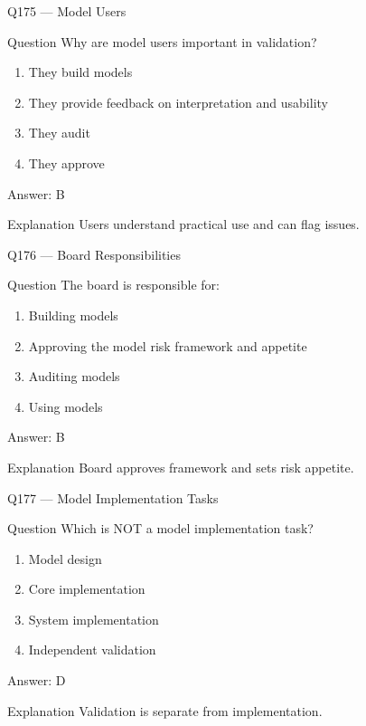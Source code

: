 \documentclass[aspectratio=169,8pt]{beamer}
\begin{document}
	\begin{frame}{Q175 --- Model Users}
		\begin{block}{Question}
			Why are model users important in validation?
		\end{block}
		\begin{enumerate}
			\item They build models
			\item They provide feedback on interpretation and usability
			\item They audit
			\item They approve
		\end{enumerate}
		\begin{exampleblock}{Answer: B}\end{exampleblock}
		\begin{block}{Explanation}
			Users understand practical use and can flag issues.
		\end{block}
	\end{frame}
	
	\begin{frame}{Q176 --- Board Responsibilities}
		\begin{block}{Question}
			The board is responsible for:
		\end{block}
		\begin{enumerate}
			\item Building models
			\item Approving the model risk framework and appetite
			\item Auditing models
			\item Using models
		\end{enumerate}
		\begin{exampleblock}{Answer: B}\end{exampleblock}
		\begin{block}{Explanation}
			Board approves framework and sets risk appetite.
		\end{block}
	\end{frame}
	
	\begin{frame}{Q177 --- Model Implementation Tasks}
		\begin{block}{Question}
			Which is NOT a model implementation task?
		\end{block}
		\begin{enumerate}
			\item Model design
			\item Core implementation
			\item System implementation
			\item Independent validation
		\end{enumerate}
		\begin{exampleblock}{Answer: D}\end{exampleblock}
		\begin{block}{Explanation}
			Validation is separate from implementation.
		\end{block}
	\end{frame}
	
\end{document}
